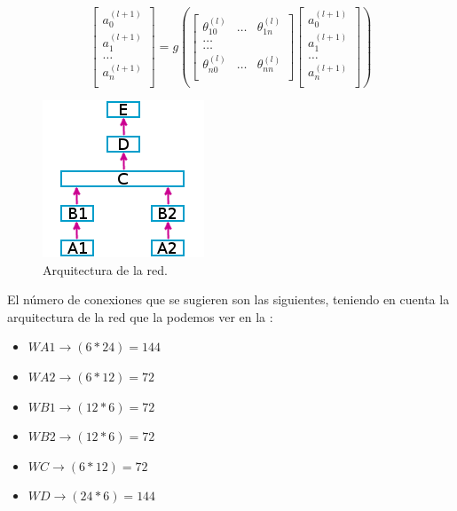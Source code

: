 $$
 \begin{bmatrix}
  a_{0}^{(l+1)}\\
  a_{1}^{(l+1)}\\
  \dots\\
  a_{n}^{(l+1)}\\
 \end{bmatrix}
 = g \left( 
  \begin{bmatrix}
  \theta_{10}^{(l)} & \dots & \theta_{1n}^{(l)}\\
  \dots \\
  \dots\\
  \theta_{n0}^{(l)} & \dots & \theta_{nn}^{(l)}\\
 \end{bmatrix}
 \begin{bmatrix}
  a_{0}^{(l+1)}\\
  a_{1}^{(l+1)}\\
  \dots\\
  a_{n}^{(l+1)}\\
 \end{bmatrix}
 \right)
 $$

  \begin{figure}[H]
   \centering
   \includegraphics[scale=.5]{../Figuras/Hinton/RedRelaciones.png}
   \caption{Arquitectura de la red.}
  \label{fig:redArq}
  \end{figure}

El número de conexiones que se sugieren son las siguientes, teniendo en cuenta la arquitectura de la red que la podemos ver en la :

\begin{itemize}
 \item $WA1\rightarrow(6*24)=144$ 
 \item  $WA2\rightarrow(6*12)=72$
 \item $WB1\rightarrow(12*6)=72$
 \item $WB2\rightarrow(12*6)=72$
 \item $WC\rightarrow(6*12)=72$
 \item $WD\rightarrow(24*6)=144$
\end{itemize}

